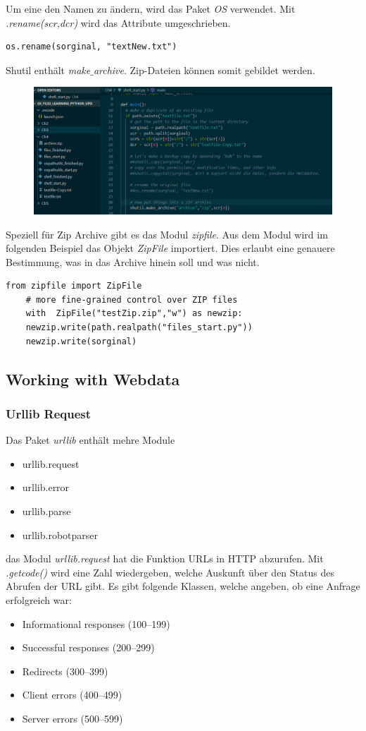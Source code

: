 Um eine den Namen zu ändern, wird das Paket \textit{OS} verwendet. Mit \textit{.rename(scr,dcr)} wird das Attribute umgeschrieben.
\begin{lstlisting}[style=python]
	os.rename(sorginal, "textNew.txt")
\end{lstlisting}

Shutil enthält \textit{make}$\_$\textit{archive}. Zip-Dateien können somit gebildet werden.
\begin{figure}[H]
	\centering
	\includegraphics[scale = 0.3]{attachment/chapter_3/Scc072}
\end{figure}

Speziell für Zip Archive gibt es das Modul \textit{zipfile}. Aus dem Modul wird im folgenden Beispiel das Objekt \textit{ZipFile} importiert. Dies erlaubt eine genauere Bestimmung, was in das Archive hinein soll und was nicht.
\begin{lstlisting}[style=python]
	from zipfile import ZipFile
	# more fine-grained control over ZIP files
	with  ZipFile("testZip.zip","w") as newzip:
	newzip.write(path.realpath("files_start.py"))
	newzip.write(sorginal)
\end{lstlisting}

\subsection{Working with Webdata} 
\subsubsection{Urllib Request}
Das Paket \textit{urllib} enthält mehre Module
\begin{itemize}
	\item urllib.request
	\item urllib.error
	\item urllib.parse
	\item urllib.robotparser
\end{itemize}
das Modul \textit{urllib.request} hat die Funktion \gls{URL}s in \gls{HTTP} abzurufen. Mit \textit{.getcode()} wird eine Zahl wiedergeben, welche Auskunft über den Status des Abrufen der \gls{URL} gibt.
Es gibt folgende Klassen, welche angeben, ob eine Anfrage erfolgreich war:
\begin{itemize}
	\item Informational responses (100–199)
	\item Successful responses (200–299)
	\item Redirects (300–399)
	\item Client errors (400–499)
	\item Server errors (500–599)
\end{itemize}

